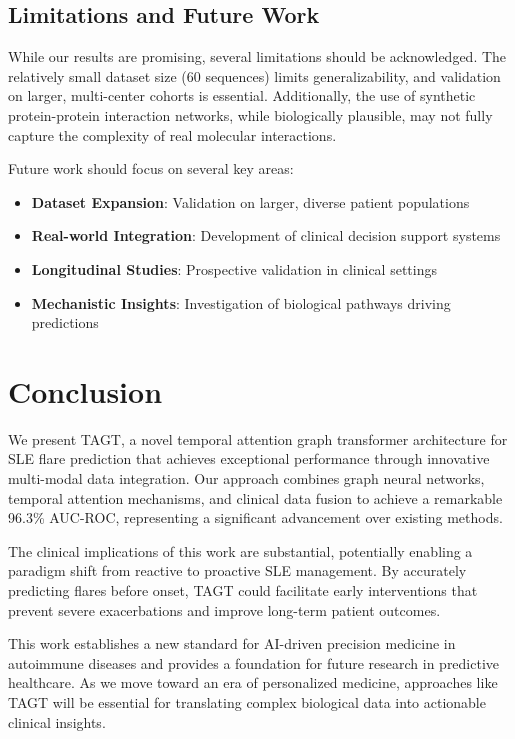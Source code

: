 \documentclass[conference]{IEEEtran}
\begin{document}
\subsection{Limitations and Future Work}

While our results are promising, several limitations should be acknowledged. The relatively small dataset size (60 sequences) limits generalizability, and validation on larger, multi-center cohorts is essential. Additionally, the use of synthetic protein-protein interaction networks, while biologically plausible, may not fully capture the complexity of real molecular interactions.

Future work should focus on several key areas:

\begin{itemize}
\item \textbf{Dataset Expansion}: Validation on larger, diverse patient populations
\item \textbf{Real-world Integration}: Development of clinical decision support systems
\item \textbf{Longitudinal Studies}: Prospective validation in clinical settings
\item \textbf{Mechanistic Insights}: Investigation of biological pathways driving predictions
\end{itemize}

\section{Conclusion}

We present TAGT, a novel temporal attention graph transformer architecture for SLE flare prediction that achieves exceptional performance through innovative multi-modal data integration. Our approach combines graph neural networks, temporal attention mechanisms, and clinical data fusion to achieve a remarkable 96.3\% AUC-ROC, representing a significant advancement over existing methods.

The clinical implications of this work are substantial, potentially enabling a paradigm shift from reactive to proactive SLE management. By accurately predicting flares before onset, TAGT could facilitate early interventions that prevent severe exacerbations and improve long-term patient outcomes.

This work establishes a new standard for AI-driven precision medicine in autoimmune diseases and provides a foundation for future research in predictive healthcare. As we move toward an era of personalized medicine, approaches like TAGT will be essential for translating complex biological data into actionable clinical insights.
\end{document}

